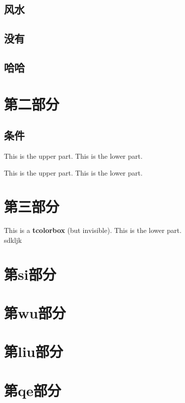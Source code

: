 \documentclass{beamer}
\begin{document}
	\subsection{风水}
	\subsection{没有}
	\subsection{哈哈}
	

	\section{第二部分}
	\subsection{条件}
	\begin{frame}
		\begin{tcolorbox}[title=Lower separated] This is the upper part.
			\tcblower
			This is the lower part.
		\end{tcolorbox}
	
		\begin{tcolorbox}[sidebyside,title=Lower separated]
			This is the upper part.
			\tcblower
			This is the lower part.
		\end{tcolorbox}
	\end{frame}	

	\section{第三部分}
	\begin{frame}
		\begin{tcolorbox}[upperbox=invisible,colback=white]
			This is a \textbf{tcolorbox} (but invisible).
			\tcblower
			This is the lower part.\\
			sdkljk
		\end{tcolorbox}
	\end{frame}
	\section{第si部分}
	\section{第wu部分}
	\section{第liu部分}
	\section{第qe部分}
	
\end{document}
